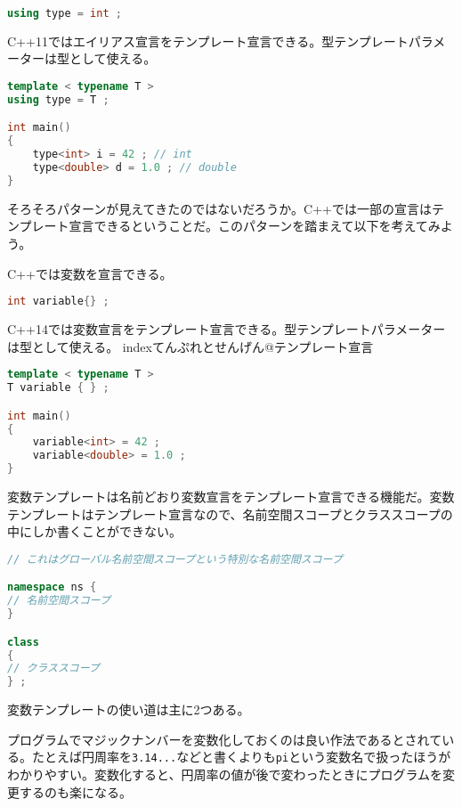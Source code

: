 \begin{lstlisting}[language=C++]
using type = int ;
\end{lstlisting}

C++11ではエイリアス宣言をテンプレート宣言できる。型テンプレートパラメーターは型として使える。

\begin{lstlisting}[language=C++]
template < typename T >
using type = T ;

int main()
{
    type<int> i = 42 ; // int
    type<double> d = 1.0 ; // double
}
\end{lstlisting}

そろそろパターンが見えてきたのではないだろうか。C++では一部の宣言はテンプレート宣言できるということだ。このパターンを踏まえて以下を考えてみよう。

C++では変数を宣言できる。

\begin{lstlisting}[language=C++]
int variable{} ;
\end{lstlisting}

C++14では変数宣言をテンプレート宣言できる。型テンプレートパラメーターは型として使える。
index{てんぷれとせんげん@テンプレート宣言}

\begin{lstlisting}[language=C++]
template < typename T >
T variable { } ;

int main()
{
    variable<int> = 42 ;
    variable<double> = 1.0 ;
}
\end{lstlisting}

変数テンプレートは名前どおり変数宣言をテンプレート宣言できる機能だ。変数テンプレートはテンプレート宣言なので、名前空間スコープとクラススコープの中にしか書くことができない。

\begin{lstlisting}[language=C++]
// これはグローバル名前空間スコープという特別な名前空間スコープ

namespace ns {
// 名前空間スコープ
}

class
{
// クラススコープ
} ;
\end{lstlisting}

変数テンプレートの使い道は主に2つある。

%

プログラムでマジックナンバーを変数化しておくのは良い作法であるとされている。たとえば円周率を\lstinline!3.14...!などと書くよりも\lstinline!pi!という変数名で扱ったほうがわかりやすい。変数化すると、円周率の値が後で変わったときにプログラムを変更するのも楽になる。

